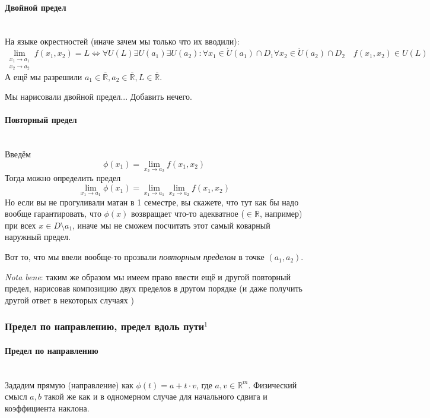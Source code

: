 \documentclass{article}
\let\vanillaparagraph\paragraph
\renewcommand{\paragraph}[1]{\vanillaparagraph{#1}\mbox{}\\}
\begin{document}
\paragraph{Двойной предел}
На языке окрестностей (иначе зачем мы только что их вводили):
$$
\lim_{\begin{array}{c} x_1\rightarrow a_1 \\ x_2 \rightarrow a_2 \end{array}} f(x_1, x_2) = L \Leftrightarrow \forall U(L) \exists U(a_1) \exists U(a_2) : \forall x_1 \in \dot{U}(a_1) \cap D_1 \forall x_2 \in \dot{U}(a_2) \cap D_2 \quad f(x_1, x_2) \in U(L) 
$$
А ещё мы разрешили $a_1 \in \overline{\mathbb{R}}, a_2 \in \overline{\mathbb{R}}, L \in \overline{\mathbb{R}}$.

Мы нарисовали двойной предел... Добавить нечего.

\paragraph{Повторный предел}
Введём 
$$\phi(x_1) = \lim_{x_2 \rightarrow a_2} f(x_1, x_2)$$
Тогда можно определить предел
$$
\lim_{x_1\rightarrow a_1} \phi(x_1) = \lim_{x_1\rightarrow a_1} \lim_{x_2 \rightarrow a_2} f(x_1, x_2)
$$
Но если вы не прогуливали матан в 1 семестре, вы скажете, что тут как бы надо вообще гарантировать, что $\phi(x)$ возвращает что-то адекватное ($\in \mathbb{R}$, например) при всех $x \in D \setminus a_1$, иначе мы не сможем посчитать этот самый коварный наружный предел.

Вот то, что мы ввели вообще-то прозвали \textit{повторным пределом} в точке $(a_1, a_2)$.

\textit{Nota bene}: таким же образом мы имеем право ввести ещё и другой повторный предел, нарисовав композицию двух пределов в другом порядке (и даже получить другой ответ в некоторых случаях \Smiley)

\subsubsection{Предел по направлению, предел вдоль пути\texorpdfstring{$^1$}{}}
\paragraph{Предел по направлению}
Зададим прямую (направление) как $\phi(t) = a + t\cdot v$, где $a, v \in \mathbb{R}^m$. Физический смысл $a, b$ такой же как и в одномерном случае для начального сдвига и коэффициента наклона.
\end{document}
